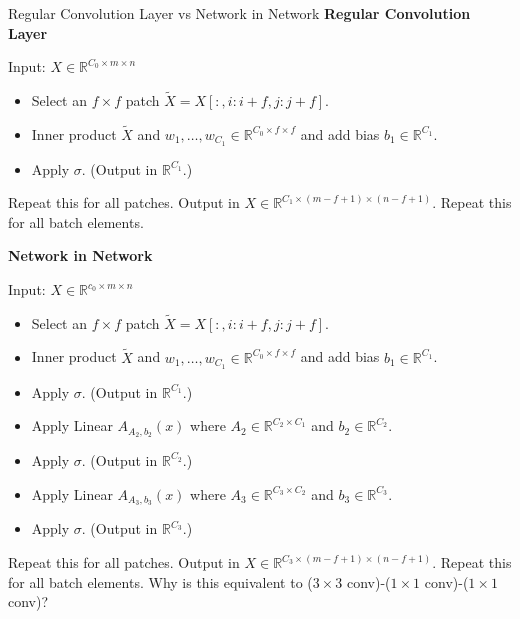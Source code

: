 \begin{frame}[allowframebreaks]

\begin{myconceptblock}{7.14}{Regular Convolution Layer vs Network in Network}
    \textbf{Regular Convolution Layer}

    Input: $X \in \mathbb{R}^{C_{0} \times m \times n}$

    \begin{itemize}
        \item Select an $f \times f$ patch $\tilde{X}=X[:, i: i+f, j: j+f]$.
        \item Inner product $\tilde{X}$ and $w_{1}, \ldots, w_{C_{1}} \in \mathbb{R}^{C_{0} \times f \times f}$ and add bias $b_{1} \in \mathbb{R}^{C_{1}}$.
        \item Apply $\sigma$. (Output in $\mathbb{R}^{C_{1}}$.)
    \end{itemize}

    Repeat this for all patches. Output in $X \in \mathbb{R}^{C_{1} \times(m-f+1) \times(n-f+1)}$.
    Repeat this for all batch elements.

    \par\noindent\textcolor{gray}{\hdashrule{\textwidth}{0.4pt}{1pt 2pt}}

    \textbf{Network in Network}

    Input: $X \in \mathbb{R}^{c_{0} \times m \times n}$

    \begin{itemize}
        \item Select an $f \times f$ patch $\tilde{X}=X[:, i: i+f, j: j+f]$.
        \item Inner product $\tilde{X}$ and $w_{1}, \ldots, w_{C_{1}} \in \mathbb{R}^{C_{0} \times f \times f}$ and add bias $b_{1} \in \mathbb{R}^{C_{1}}$.
        \item Apply $\sigma$. (Output in $\mathbb{R}^{C_{1}}$.)
        \item Apply Linear $A_{A_{2}, b_{2}}(x)$ where $A_{2} \in \mathbb{R}^{C_{2} \times C_{1}}$ and $b_{2} \in \mathbb{R}^{C_{2}}$.
        \item Apply $\sigma$. (Output in $\mathbb{R}^{C_{2}}$.)
        \item Apply Linear $A_{A_{3}, b_{3}}(x)$ where $A_{3} \in \mathbb{R}^{C_{3} \times C_{2}}$ and $b_{3} \in \mathbb{R}^{C_{3}}$.
        \item Apply $\sigma$. (Output in $\mathbb{R}^{C_{3}}$.)
    \end{itemize}

    Repeat this for all patches. Output in $X \in \mathbb{R}^{C_{3} \times(m-f+1) \times(n-f+1)}$. Repeat this for all batch elements.
    Why is this equivalent to ($3 \times 3$ conv)-($1 \times 1$ conv)-($1 \times 1$ conv)?
\end{myconceptblock}

\end{frame}

